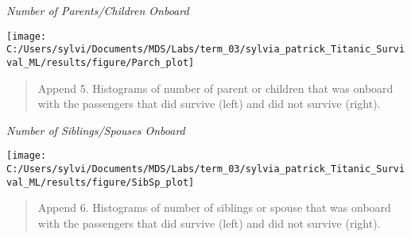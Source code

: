 \documentclass[]{article}
\begin{document}
\emph{Number of Parents/Children Onboard}

\begin{center}\texttt{[image: C:/Users/sylvi/Documents/MDS/Labs/term\_03/sylvia\_patrick\_Titanic\_Survival\_ML/results/figure/Parch\_plot]} \end{center}

\begin{quote}
Append 5. Histograms of number of parent or children that was onboard
with the passengers that did survive (left) and did not survive (right).
\end{quote}

\newpage

\emph{Number of Siblings/Spouses Onboard}

\begin{center}\texttt{[image: C:/Users/sylvi/Documents/MDS/Labs/term\_03/sylvia\_patrick\_Titanic\_Survival\_ML/results/figure/SibSp\_plot]} \end{center}

\begin{quote}
Append 6. Histograms of number of siblings or spouse that was onboard
with the passengers that did survive (left) and did not survive (right).
\end{quote}
\end{document}
